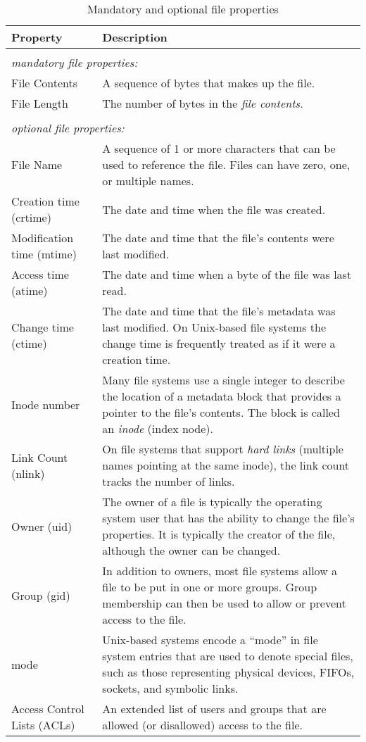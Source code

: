 \begin{table}
\begin{tabularx}{\textwidth}{lX}
Property & Description \\
\hline
\\
\multicolumn{2}{l}{\textit{\small mandatory file properties:}}\\
File Contents & A sequence of bytes that makes up the file.\\
File Length   & The number of bytes in the \emph{file contents}.\\
\\
\multicolumn{2}{l}{\textit{\small optional file properties:}}\\
File Name & A sequence of 1 or more characters that can be used to reference the file. Files can have
zero, one, or multiple names.\\
Creation time (crtime) & The date and time when the file was created.\\
Modification time (mtime) & The date and time that the file's contents were last modified.\\
Access time (atime) & The date and time when a  byte of the file was last read.\\
Change time (ctime) & The date and time that the file's metadata was last modified. On Unix-based file systems
   the change time is frequently treated as if it were a creation time.\\
Inode number & Many file systems use a single integer to describe the location of a metadata block that provides a pointer to the file's contents. The block is called an \emph{inode} (index node).\\
Link Count (nlink) & On file systems that support \emph{hard links} (multiple names pointing at the same inode), the link count tracks the number of links.\\
Owner (uid) & The owner of a file is typically the operating system user that has the ability to change the file's properties. It is typically the creator of the file, although the owner can be changed.\\
Group (gid) & In addition to owners, most file systems allow a file to be put in one or more groups. Group membership can then be used to allow or prevent access to the file.\\
mode & Unix-based systems encode a ``mode'' in file system entries that are used to denote special files, such as those representing physical devices, FIFOs, sockets, and symbolic links.\\
Access Control Lists (ACLs) & An extended list of users and groups that are allowed (or disallowed) access to the file.
\end{tabularx}
\caption{Mandatory and optional file properties}\label{file-properties}
\end{table}

